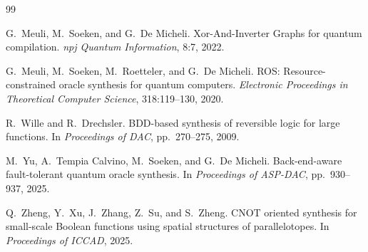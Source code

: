 \documentclass[UTF8,fontset=macnew,11pt]{ctexart}
\begin{document}
\begin{thebibliography}{99}

G.~Meuli, M.~Soeken, and G.~De Micheli.
\newblock Xor-And-Inverter Graphs for quantum compilation.
\newblock \emph{npj Quantum Information}, 8:7, 2022.

G.~Meuli, M.~Soeken, M.~Roetteler, and G.~De Micheli.
\newblock ROS: Resource-constrained oracle synthesis for quantum computers.
\newblock \emph{Electronic Proceedings in Theoretical Computer Science}, 318:119--130, 2020.

R.~Wille and R.~Drechsler.
\newblock BDD-based synthesis of reversible logic for large functions.
\newblock In \emph{Proceedings of DAC}, pp.~270--275, 2009.

M.~Yu, A.~Tempia Calvino, M.~Soeken, and G.~De Micheli.
\newblock Back-end-aware fault-tolerant quantum oracle synthesis.
\newblock In \emph{Proceedings of ASP-DAC}, pp.~930--937, 2025.

Q.~Zheng, Y.~Xu, J.~Zhang, Z.~Su, and S.~Zheng.
\newblock CNOT oriented synthesis for small-scale Boolean functions using spatial structures of parallelotopes.
\newblock In \emph{Proceedings of ICCAD}, 2025.

\end{thebibliography}
\end{document}

